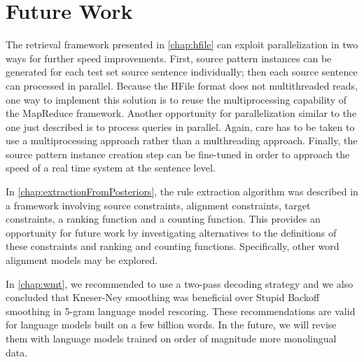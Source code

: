 \section{Future Work}
\label{sec:thesisFutureWork}


The retrieval framework presented in \autoref{chap:hfile}
can exploit parallelization in two ways for further
speed improvements. First, source pattern instances
can be generated for each test set source sentence individually; then
each source sentence can processed in parallel. Because
the HFile format does not multithreaded reads, %
one way to implement this solution is to reuse the multiprocessing
capability of the MapReduce framework.
Another opportunity for parallelization similar to the one just described
is to process queries in parallel. Again, care has to be taken to use
a multiprocessing approach rather than a multhreading approach.
Finally, the source pattern instance creation step can be fine-tuned
in order to approach the speed of a real time system at the sentence
level.


In \autoref{chap:extractionFromPosteriors}, the rule extraction
algorithm was described in a framework involving
source constraints, alignment constraints, target constraints, a ranking
function and a counting function. This provides an opportunity
for future work by investigating alternatives to the definitions
of these constraints and ranking and counting functions.
Specifically, other word alignment models may be explored.


In \autoref{chap:wmt}, we recommended to use a two-pass
decoding strategy and we also concluded that Kneser-Ney
smoothing was beneficial over Stupid Backoff smoothing
in 5-gram language model rescoring. These recommendations
are valid for language models built on a few billion words.
In the future, we will revise them with language models
trained on order of magnitude more monolingual data.


